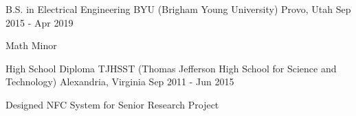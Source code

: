 

\begin{cventries}

  \cventry
  {B.S. in Electrical Engineering} %
  {BYU (Brigham Young University)} %
  {Provo, Utah} %
  {Sep 2015 - Apr 2019} %
    {
      \begin{cvitems} %
      \item {Math Minor}
      \end{cvitems}
    }

  \cventry
  {High School Diploma} %
  {TJHSST (Thomas Jefferson High School for Science and Technology)} %
  {Alexandria, Virginia} %
  {Sep 2011 - Jun 2015} %
    {
      \begin{cvitems} %
      \item {Designed NFC System for Senior Research Project}
      \end{cvitems}
    }

\end{cventries}

